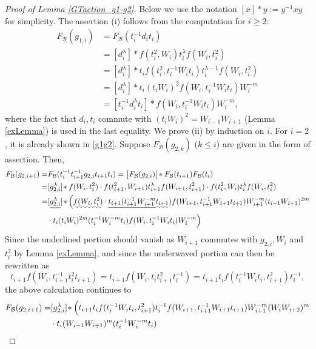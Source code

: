 \documentclass[a4paper,10pt,reqno]{amsart}
\newcommand\FB{F_{\mathcal{B}}}
\begin{document}
\begin{proof}[Proof of Lemma \ref{GTaction_g1-g2}]


Below we use the notation $[x]\!\ast y:=y^{-1}xy$ for simplicity.
The assertion (i) follows from the computation for $i\ge 2$:
\begin{align*}
\FB(g_{1,i})&=\FB(t_i^{-1}d_it_i) \\
&=[d_i^\lambda]\!\ast f(t_i^2,W_i)t_i^\lambda f(W_i,t_i^2) \\
&=[d_i^\lambda]\!\ast t_i f(t_i^2,t_i^{-1}W_it_i) t_i^{\lambda-1}
f(W_i,t_i^2) \\
&=[d_i^\lambda]\!\ast t_i (t_iW_i)^2
f(W_i,t_i^{-1}W_it_i) W_i^{-m}\\
&=[t_i^{-1}d_i^\lambda t_i]\!\ast
f(W_i,t_i^{-1}W_it_i) W_i^{-m},
\end{align*}
where the fact that $d_i,t_i$ commute with 
$(t_iW_i)^2=W_{i-1}W_{i+1}$ (Lemma \ref{exLemma})
is used in the last equality.
We prove (ii) by induction on $i$. 
For $i=2$, it is already shown in \eqref{g1g2}.
Suppose $\FB(g_{2,k})$ ($k\le i$) are given in the
form of assertion. 
Then, 
\begin{align*}
\FB(g_{2,i+1})=&\FB(t_{i}^{-1} t_{i+1}^{-1}g_{2,i}t_{i+1} t_{i}) 
=\bigl[ \FB(g_{2,i}) \bigr]\!\ast \FB(t_{i+1}) \FB(t_i) \\
=&[g_{2,i}^\lambda]\!\ast f(W_i,t_i^2)\cdot
f(t_{i+1}^2,W_{i+1}) t_{i+1}^\lambda f(W_{i+1},t_{i+1}^2)
\cdot
f(t_{i}^2,W_{i}) t_{i}^\lambda f(W_{i},t_{i}^2)\\
=&
[\underline{g_{2,i}^\lambda}]\!\ast\Bigl( 
\uwave{f(W_i,t_i^2)}\cdot 
\underline{t_{i+1}
(t_{i+1}^{-1}W_{i+1}^{-m}} 
\uwave{t_{i+1}}) 
f(W_{i+1},t_{i+1}^{-1}W_{i+1}t_{i+1})
W_{i+1}^{-m}
(t_{i+1}W_{i+1})^{2m} \\
&\cdot
t_{i}(t_{i}W_{i})^{2m}(t_{i}^{-1}W_{i}^{-m}t_{i}) 
f(W_{i},t_{i}^{-1}W_{i}t_{i})W_{i}^{-m}\Bigr) 
\end{align*}
Since the underlined portion should vanish as
$W_{i+1}$ commutes with $g_{2,i}, W_i$ and $t_i^2$
by Lemma \ref{exLemma}, and since 
the underwaved portion can then be rewritten as
$$
t_{i+1}f(W_i,t_{i+1}^{-1}t_i^2t_{i+1})=t_{i+1}f(W_i,t_it_{i+1}^2t_i^{-1})
=t_{i+1}t_i f(t_i^{-1}W_it_i,t_{i+1}^2)t_i^{-1},
$$
the above calculation continues to
\allowdisplaybreaks
\begin{align*}
\FB(g_{2,i+1})=&
[g_{2,i}^\lambda]\!\ast\Bigl(
t_{i+1}t_i
f(t_i^{-1}W_it_i,t_{i+1}^2)
t_i^{-1}f(W_{i+1},t_{i+1}^{-1}W_{i+1}t_{i+1})
W_{i+1}^{-m}
(W_iW_{i+2})^m \\
&\cdot
t_{i}(W_{i-1}W_{i+1})^m(t_{i}^{-1}W_{i}^{-m}t_{i}) 

\end{align*}
\end{proof}
\end{document}

